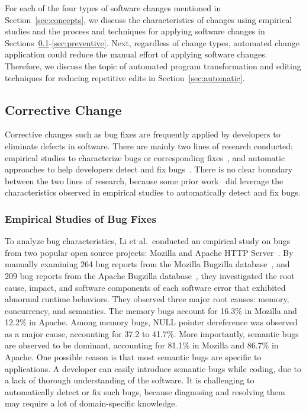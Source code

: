 \documentclass[runningheads,a4paper]{llncs}
\begin{document}
For each of the four types of software changes mentioned in Section~\ref{sec:concepts}, we discuss the characteristics of changes using empirical studies and the process and techniques for applying software changes in Sections~\ref{sec:corrective}-\ref{sec:preventive}. Next, regardless of change types, automated change application could reduce the manual effort of applying software changes. Therefore, we discuss the topic of automated program transformation and editing techniques for reducing repetitive edits in Section~\ref{sec:automatic}.

\subsection{Corrective Change}
\label{sec:corrective}
Corrective changes such as bug fixes are frequently applied by developers to eliminate defects in software. There are mainly two lines of research conducted: empirical studies to characterize bugs or corresponding fixes~\cite{Fenton2000:QAF,Li2006:TCE,Kim2006:MBF,Lu2008:LMC,Nguyen2010:RBF,Yin2011:FBB,Park2012:supplementary,Zhong2015:ESR}, and automatic approaches to help developers detect and fix bugs~\cite{Engler2000:CSR,Bush2000:SAF,Hangal2002:TDS,Hovemeyer2004:FBE,Naik2006:ESR,Weimer2009:AFP}. There is no clear boundary between the two lines of research, because some prior work~\cite{Li2006:CPMiner,Pham2010:DRS,Jin2012:UDR,Kim2013:PAR} did leverage the characteristics observed in empirical studies to automatically detect and fix bugs.

\subsubsection{Empirical Studies of Bug Fixes}
To analyze bug characteristics, Li et al.~conducted an empirical study on bugs from two popular open source projects: Mozilla and Apache HTTP Server~\cite{Li2006:TCE}. By manually examining 264 bug reports from the Mozilla Bugzilla database~\cite{mozilla}, and 209 bug reports from the Apache Bugzilla database~\cite{asf}, they investigated the root cause, impact, and software components of each software error that exhibited abnormal runtime behaviors. They observed three major root causes: memory, concurrency, and semantics. The memory bugs account for 16.3\% in Mozilla and 12.2\% in Apache. Among memory bugs, NULL pointer dereference was observed as a major cause, accounting for 37.2 to 41.7\%. More importantly, semantic bugs are observed to be dominant, accounting for 81.1\% in Mozilla and 86.7\% in Apache. One possible reason is that most semantic bugs are specific to applications. A developer can easily introduce semantic bugs while coding, due to a lack of thorough understanding of the software. It is challenging to automatically detect or fix such bugs, because diagnosing and resolving them may require a lot of domain-specific knowledge.
\end{document}
